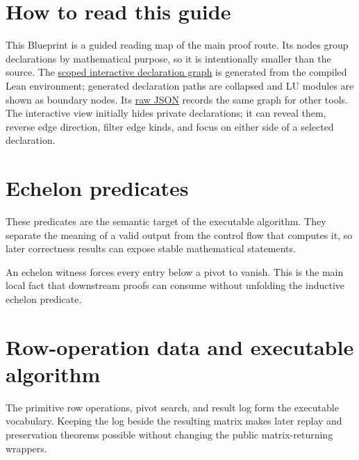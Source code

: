 \chapter*{How to read this guide}

This Blueprint is a guided reading map of the main proof route.  Its nodes group declarations
by mathematical purpose, so it is intentionally smaller than the source.  The
\href{dependency-graph/index.html}{scoped interactive declaration graph} is generated from
the compiled Lean environment; generated declaration paths are collapsed and LU modules are
shown as boundary nodes.  Its
\href{dependency-graph/graph.json}{raw JSON} records the same graph for other tools.  The
interactive view initially hides private declarations; it can reveal them, reverse edge
direction, filter edge kinds, and focus on either side of a selected declaration.

\chapter{Echelon predicates}

\begin{definition}
\label{def:echelon-predicates}
\leanok
These predicates are the semantic target of the executable algorithm.  They separate the
meaning of a valid output from the control flow that computes it, so later correctness results
can expose stable mathematical statements.
\end{definition}

\begin{theorem}
\label{thm:pivot-column-zero-below}
\leanok
{}
An echelon witness forces every entry below a pivot to vanish.  This is the main local fact that
downstream proofs can consume without unfolding the inductive echelon predicate.
\end{theorem}

\chapter{Row-operation data and executable algorithm}

\begin{definition}
\label{def:row-operation-data}
\leanok
The primitive row operations, pivot search, and result log form the executable vocabulary.
Keeping the log beside the resulting matrix makes later replay and preservation theorems
possible without changing the public matrix-returning wrappers.
\end{definition}

